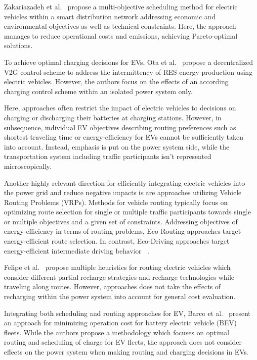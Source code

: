 \documentclass[conference]{IEEEtran}
\begin{document}
	Zakariazadeh et al.~\cite{zakariazadeh2014multi} propose a multi-objective scheduling method for electric vehicles within a smart distribution network addressing economic and environmental objectives as well as technical constraints. Here, the approach manages to reduce operational costs and emissions, achieving Pareto-optimal solutions.
	
	To achieve optimal charging decisions for EVs, Ota et al.~\cite{ota2012autonomous} propose a decentralized V2G control scheme to address the intermittency of RES energy production using electric vehicles. However, the authors focus on the effects of an according charging control scheme within an isolated power system only.
	
	Here, approaches often restrict the impact of electric vehicles to decisions on charging or discharging their batteries at charging stations. However, in subsequence, individual EV objectives describing routing preferences such as shortest traveling time or energy-efficiency for EVs cannot be sufficiently taken into account. Instead, emphasis is put on the power system side, while the transportation system including traffic participants isn't represented microscopically. 
	
	Another highly relevant direction for efficiently integrating electric vehicles into the power grid and reduce negative impacts is are approaches utilizing Vehicle Routing Problems (VRPs). Methods for vehicle routing typically focus on optimizing route selection for single or multiple traffic participants towards single or multiple objectives and a given set of constraints. Addressing objectives of energy-efficiency in terms of routing problems, Eco-Routing approaches target energy-efficient route selection. In contrast, Eco-Driving approaches target energy-efficient intermediate driving behavior ~\cite{ericsson2006optimizing}.
	
	Felipe et al.~\cite{felipe2014heuristic} propose multiple heuristics for routing electric vehicles which consider different partial recharge strategies and recharge technologies while traveling along routes. However, approaches does not take the effects of recharging within the power system into account for general cost evaluation. 
	
	Integrating both scheduling and routing approaches for EV, Barco et al.~\cite{barco2013optimal} present an approach for minimizing operation cost for battery electric vehicle (BEV) fleets. While the authors propose a methodology which focuses on optimal routing and scheduling of charge for EV fleets, the approach does not consider effects on the power system when making routing and charging decisions in EVs.
\end{document}
